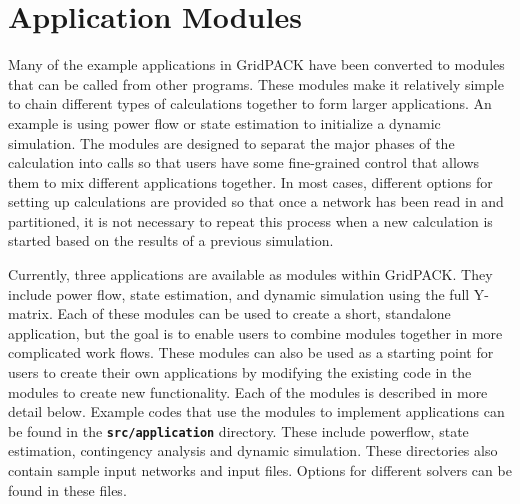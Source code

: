 \chapter{Application Modules}

Many of the example applications in GridPACK have been converted to modules that can be called from other programs. These modules make it relatively simple to chain different types of calculations together to form larger applications. An example is using power flow or state estimation to initialize a dynamic simulation. The modules are designed to separat the major phases of the calculation into calls so that users have some fine-grained control that allows them to mix different applications together. In most cases, different options for setting up calculations are provided so that once a network has been read in and partitioned, it is not necessary to repeat this process when a new calculation is started based on the results of a previous simulation.

Currently, three applications are available as modules within GridPACK. They include power flow, state estimation, and dynamic simulation using the full Y-matrix. Each of these modules can be used to create a short, standalone application, but the goal is to enable users to combine modules together in more complicated work flows. These modules can also be used as a starting point for users to create their own applications by modifying the existing code in the modules to create new functionality. Each of the modules is described in more detail below. Example codes that use the modules to implement applications can be found in the \texttt{\textbf{src/application}} directory. These include powerflow, state estimation, contingency analysis and dynamic simulation. These directories also contain sample input networks and input files. Options for different solvers can be found in these files.
\newline
\hyperlink{topDoc}{\color{blue}{Top}}
